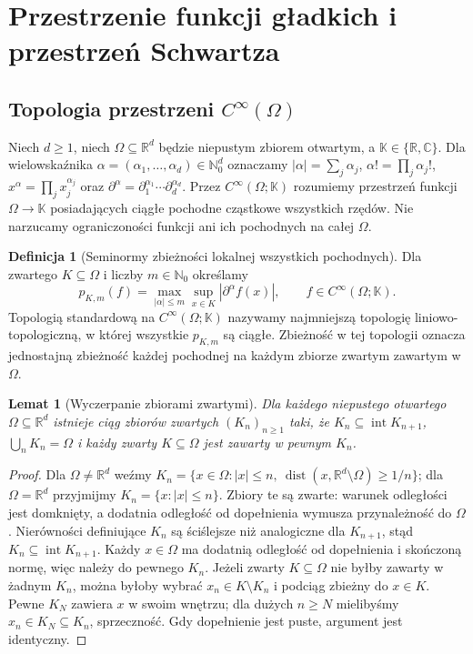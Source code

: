 \documentclass[11pt,a4paper]{article}
\numberwithin{equation}{section}
\theoremstyle{plain}
\newtheorem{lemat}[twierdzenie]{Lemat}
\theoremstyle{definition}
\newtheorem{definicja}[twierdzenie]{Definicja}
\theoremstyle{remark}
\newcommand{\R}{\mathbb R}
\newcommand{\C}{\mathbb C}
\newcommand{\N}{\mathbb N}
\newcommand{\K}{\mathbb K}
\begin{document}
\setcounter{section}{16}
\section{Przestrzenie funkcji gładkich i przestrzeń Schwartza}
\label{sec:gladkie-schwartz17}

\subsection{Topologia przestrzeni \texorpdfstring{$C^\infty(\Omega)$}{Cinfty(Omega)}}

Niech $d\ge1$, niech $\Omega\subseteq\R^d$ będzie niepustym zbiorem
otwartym, a $\K\in\{\R,\C\}$. Dla wielowskaźnika
$\alpha=(\alpha_1,\dots,\alpha_d)\in\N_0^d$ oznaczamy
$|\alpha|=\sum_j\alpha_j$, $\alpha!=\prod_j\alpha_j!$,
$x^\alpha=\prod_jx_j^{\alpha_j}$ oraz
$\partial^\alpha=\partial_1^{\alpha_1}\cdots\partial_d^{\alpha_d}$.
Przez $C^\infty(\Omega;\K)$ rozumiemy przestrzeń funkcji
$\Omega\to\K$ posiadających ciągłe pochodne cząstkowe wszystkich rzędów.
Nie narzucamy ograniczoności funkcji ani ich pochodnych na całej $\Omega$.

\begin{definicja}[Seminormy zbieżności lokalnej wszystkich pochodnych]
\label{def:seminormy-cinf17}
Dla zwartego $K\subseteq\Omega$ i liczby $m\in\N_0$ określamy
\[
 p_{K,m}(f)=\max_{|\alpha|\le m}\sup_{x\in K}|\partial^\alpha f(x)|,
 \qquad f\in C^\infty(\Omega;\K).
\]
Topologią standardową na $C^\infty(\Omega;\K)$ nazywamy
najmniejszą topologię liniowo-topologiczną, w której wszystkie
$p_{K,m}$ są ciągłe. Zbieżność w tej topologii oznacza
jednostajną zbieżność każdej pochodnej na każdym zbiorze zwartym
zawartym w $\Omega$.
\end{definicja}

\begin{lemat}[Wyczerpanie zbiorami zwartymi]
\label{lem:exhaustion17}
Dla każdego niepustego otwartego $\Omega\subseteq\R^d$ istnieje
ciąg zbiorów zwartych $(K_n)_{n\ge1}$ taki, że
$K_n\subseteq\operatorname{int}K_{n+1}$, $\bigcup_nK_n=\Omega$
i każdy zwarty $K\subseteq\Omega$ jest zawarty w pewnym $K_n$.
\end{lemat}
\begin{proof}
Dla $\Omega\ne\R^d$ weźmy
$K_n=\{x\in\Omega:|x|\le n,\
\operatorname{dist}(x,\R^d\setminus\Omega)\ge1/n\}$;
dla $\Omega=\R^d$ przyjmijmy $K_n=\{x:|x|\le n\}$.
Zbiory te są zwarte: warunek odległości jest domknięty,
a dodatnia odległość od dopełnienia wymusza przynależność do $\Omega$.
Nierówności definiujące $K_n$ są ściślejsze niż analogiczne dla
$K_{n+1}$, stąd $K_n\subseteq\operatorname{int}K_{n+1}$.
Każdy $x\in\Omega$ ma dodatnią odległość od dopełnienia
i skończoną normę, więc należy do pewnego $K_n$.
Jeżeli zwarty $K\subseteq\Omega$ nie byłby zawarty w żadnym $K_n$,
można byłoby wybrać $x_n\in K\setminus K_n$ i podciąg zbieżny
do $x\in K$. Pewne $K_N$ zawiera $x$ w swoim wnętrzu;
dla dużych $n\ge N$ mielibyśmy $x_n\in K_N\subseteq K_n$,
sprzeczność. Gdy dopełnienie jest puste, argument jest identyczny.
\end{proof}
\end{document}
